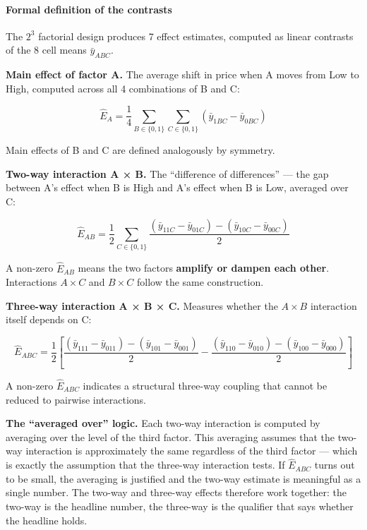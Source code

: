 \paragraph{Formal definition of the
contrasts}\label{formal-definition-of-the-contrasts}

The \(2^3\) factorial design produces 7 effect estimates, computed as
linear contrasts of the 8 cell means \(\bar{y}_{ABC}\).

\textbf{Main effect of factor A.} The average shift in price when A
moves from Low to High, computed across all 4 combinations of B and C:

\[\hat{E}_A = \frac{1}{4} \sum_{B \in \{0,1\}} \sum_{C \in \{0,1\}} (\bar{y}_{1BC} - \bar{y}_{0BC})\]

Main effects of B and C are defined analogously by symmetry.

\textbf{Two-way interaction A × B.} The ``difference of differences''
--- the gap between A's effect when B is High and A's effect when B is
Low, averaged over C:

\[\hat{E}_{AB} = \frac{1}{2} \sum_{C \in \{0,1\}} \frac{(\bar{y}_{11C} - \bar{y}_{01C}) - (\bar{y}_{10C} - \bar{y}_{00C})}{2}\]

A non-zero \(\hat{E}_{AB}\) means the two factors \textbf{amplify or
dampen each other}. Interactions \(A \times C\) and \(B \times C\)
follow the same construction.

\textbf{Three-way interaction A × B × C.} Measures whether the
\(A \times B\) interaction itself depends on C:

\[\hat{E}_{ABC} = \frac{1}{2} \left[ \frac{(\bar{y}_{111} - \bar{y}_{011}) - (\bar{y}_{101} - \bar{y}_{001})}{2} - \frac{(\bar{y}_{110} - \bar{y}_{010}) - (\bar{y}_{100} - \bar{y}_{000})}{2} \right]\]

A non-zero \(\hat{E}_{ABC}\) indicates a structural three-way coupling
that cannot be reduced to pairwise interactions.

\textbf{The ``averaged over'' logic.} Each two-way interaction is
computed by averaging over the level of the third factor. This averaging
assumes that the two-way interaction is approximately the same
regardless of the third factor --- which is exactly the assumption that
the three-way interaction tests. If \(\hat{E}_{ABC}\) turns out to be
small, the averaging is justified and the two-way estimate is meaningful
as a single number. The two-way and three-way effects therefore work
together: the two-way is the headline number, the three-way is the
qualifier that says whether the headline holds.

